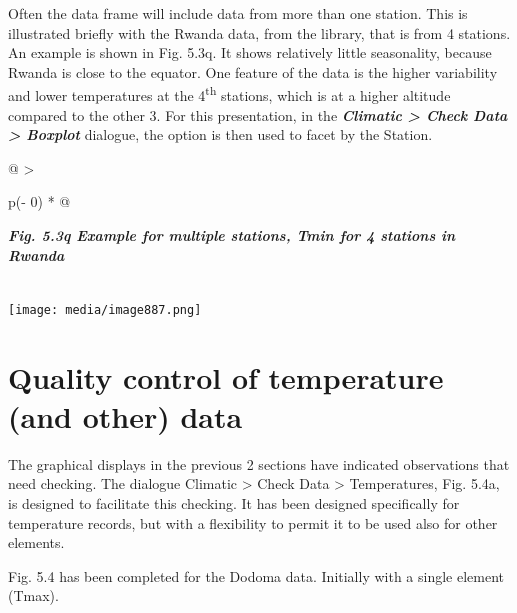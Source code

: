 \documentclass[
  letterpaper,
  DIV=11,
  numbers=noendperiod]{scrreprt}
\begin{document}
Often the data frame will include data from more than one station. This
is illustrated briefly with the Rwanda data, from the library, that is
from 4 stations. An example is shown in Fig. 5.3q. It shows relatively
little seasonality, because Rwanda is close to the equator. One feature
of the data is the higher variability and lower temperatures at the
4\textsuperscript{th} stations, which is at a higher altitude compared
to the other 3. For this presentation, in the \textbf{\emph{Climatic
\textgreater{} Check Data \textgreater{} Boxplot}} dialogue, the option
is then used to facet by the Station.

\begin{longtable}[]{@{}
  >{\raggedright\arraybackslash}p{(\columnwidth - 0\tabcolsep) * }@{}}
\toprule\noalign{}
\begin{minipage}[b]{\linewidth}\raggedright
\textbf{\emph{Fig. 5.3q Example for multiple stations, Tmin for 4
stations in Rwanda}}
\end{minipage} \\
\midrule\noalign{}
\endhead
\bottomrule\noalign{}
\endlastfoot
\texttt{[image: media/image887.png]} \\
\end{longtable}

\section{Quality control of temperature (and other)
data}\label{quality-control-of-temperature-and-other-data}

The graphical displays in the previous 2 sections have indicated
observations that need checking. The dialogue Climatic \textgreater{}
Check Data \textgreater{} Temperatures, Fig. 5.4a, is designed to
facilitate this checking. It has been designed specifically for
temperature records, but with a flexibility to permit it to be used also
for other elements.

Fig. 5.4 has been completed for the Dodoma data. Initially with a single
element (Tmax).
\end{document}
